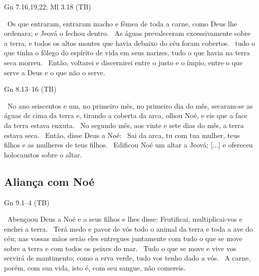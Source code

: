 \documentclass[12pt,aspectratio=169]{beamer}
\newcommand{\ver}[1]{%
    \raisebox{0.50ex}{%
        \scalebox{1.1}{%
            \pmb{\textbf{\textcolor{BSpbg}{#1}}}%
        }%
    }%
}
\newcommand{\QUOTE}[1]{%
    \par\noindent\hspace*{0.05\linewidth}%
    \begin{minipage}{0.9\linewidth}%
        \linespread{1.35}\large{#1}%
    \end{minipage}%
}
\newcommand{\RED}[1]{{\textcolor{TXred}{#1}}}
\newcommand{\ORA}[1]{{\textcolor{TXred!50!TXyel}{#1}}}
\newcommand{\YEL}[1]{{\textcolor{TXyel}{#1}}}
\newcommand{\GRE}[1]{{\textcolor{TXgre}{#1}}}
\begin{document}
    \begin{frame}{Gn 7.16,19,22; Ml 3.18 (TB)}
        \QUOTE{%
            \ver{Gn 7.16}~Os que entraram, entraram macho e fêmea de toda a carne, como Deus lhe
            ordenara; \YEL{e Jeová o fechou dentro}.
            \ver{7.19}~As águas prevaleceram excessivamente sobre a terra, e \YEL{todos} os
            altos \YEL{montes} que havia debaixo do céu foram \YEL{cobertos}.
            \ver{7.22}~\YEL{tudo} o que tinha o \GRE{fôlego do espírito de vida em seus
            narizes}, tudo o que havia na terra seca \RED{morreu}.
            \ver{Ml 3.18}~Então, \YEL{voltarei} e \YEL{discernirei} entre o \GRE{justo} e o
            \RED{ímpio}, entre o que serve a Deus e o que não o serve.
        }
    \end{frame}

    \begin{frame}{Gn 8.13--16 (TB)}
        \QUOTE{%
            \ver{13}~No \YEL{ano} seiscentos e um, no primeiro \YEL{mês}, no primeiro \YEL{dia}
            do mês, secaram-se as águas de cima da terra e, tirando a coberta da arca, olhou
            Noé, e eis que a face da terra estava enxuta.
            \ver{14}~No segundo mês, aos vinte e sete dias do mês, a terra estava \YEL{seca}.
            \ver{15}~Então, disse Deus a Noé:
            \ver{16}~\GRE{Sai da arca, tu com tua mulher, teus filhos e as mulheres de teus
            filhos}.
            \ver{20}~Edificou Noé um altar a Jeová; [...] e \ORA{ofereceu holocaustos} sobre o
            altar.
        }
    \end{frame}

    \subsection{Aliança com Noé}

    \begin{frame}{Gn 9.1--4 (TB)}
        \QUOTE{%
            \ver{1}~Abençoou Deus a Noé e a seus filhos e lhes disse: \YEL{Frutificai,
            multiplicai-vos e enchei a terra}.
            \ver{2}~Terá \ORA{medo e pavor de vós todo o animal da terra e toda a ave do céu};
            nas vossas mãos serão eles entregues juntamente com tudo o que se move sobre a terra
            e com todos os peixes do mar.
            \ver{3}~Tudo o que se move e vive vos servirá de mantimento; \YEL{como a erva verde,
            tudo vos tenho dado a vós}.
            \ver{4}~A carne, porém, com sua vida, isto é, com seu \RED{sangue, não comereis}.
        }
    \end{frame}
\end{document}
